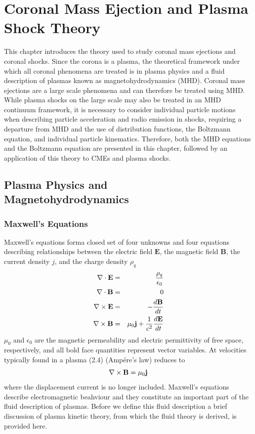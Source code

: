 \singlespacing
\chapter{Coronal Mass Ejection and Plasma Shock Theory} 
\label{chap:2}
\doublespacing
This chapter introduces the theory used to study coronal mass ejections and coronal shocks. Since the corona is a plasma, the theoretical framework under which all coronal phenomena are treated is in plasma physics and a fluid description of plasmas known as magnetohydrodynamics (MHD). Coronal mass ejections are a large scale phenomena and can therefore be treated using MHD. While plasma shocks on the large scale may also be treated in an MHD continuum framework, it is necessary to consider individual particle motions when describing particle acceleration and radio emission in shocks, requiring a departure from MHD and the use of distribution functions, the Boltzmann equation, and individual particle kinematics. Therefore, both the MHD equations and the Boltzmann equation are presented in this chapter, followed by an application of this theory to CMEs and plasma shocks.

\singlespacing
\section{Plasma Physics and  \\ Magnetohydrodynamics}\label{sec:1}
\doublespacing
\subsection{Maxwell's Equations}\label{sec:10}

Maxwell's equations forma closed set of four unknowns and four equations describing relationships between the electric field $\mathbf{E}$, the magnetic field $\mathbf{B}$, the current density $j$, and the charge density $\rho_q$
\begin{eqnarray}
\nabla \cdot \mathbf{E} &=& \frac{\rho_q}{\epsilon_0} \\
\nabla \cdot \mathbf{B} &=& 0 \\
{\bf \nabla} \times{\mathbf{E}} &=& - \frac{d\mathbf{B}}{dt} \\
{\bf \nabla} \times{\mathbf{B}} &=& \mu_0 \mathbf{j} + \frac{1}{c^2}\frac{d\mathbf{E}}{dt} 
\end{eqnarray}
$\mu_0$ and $\epsilon_0$ are the magnetic permeability and electric permittivity of free space, respectively, and all bold face quantities represent vector variables. At velocities typically found in a plasma (2.4) (Amp\'{e}re's law) reduces to
\begin{equation}
{\bf \nabla} \times{\mathbf{B}} = \mu_0 \mathbf{j}
\end{equation}
where the displacement current is no longer included. Maxwell's equations describe electromagnetic beahviour and they constitute an important part of the fluid description of plasmas. Before we define this fluid description a brief discussion of plasma kinetic theory, from which the fluid theory is derived, is provided here.

